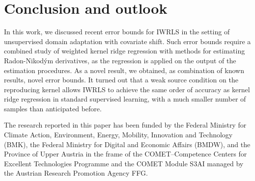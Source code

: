 \documentclass[USenglish]{article}
\begin{document}
\section{Conclusion and outlook}

In this work, we discussed recent error bounds for IWRLS in the setting of unsupervised domain adaptation with covariate shift.
Such error bounds require a combined study of weighted kernel ridge regression with methods for estimating Radon-Nikod\'ym derivatives, as the regression is applied on the output of the estimation procedures.
As a novel result, we obtained, as combination of known results, novel error bounds.
It turned out that a weak source condition on the reproducing kernel allows IWRLS to achieve the same order of accuracy as kernel ridge regression in standard supervised learning, with a much smaller number of samples than anticipated before.

\begin{acknowledgement}
The research reported in this paper has been funded by the Federal Ministry for Climate Action, Environment, Energy, Mobility, Innovation and Technology (BMK), the Federal Ministry for Digital and Economic Affairs (BMDW), and the Province of Upper Austria in the frame of the COMET--Competence Centers for Excellent Technologies Programme and the COMET Module S3AI managed by the Austrian Research Promotion Agency FFG.
\end{acknowledgement}



\end{document}
